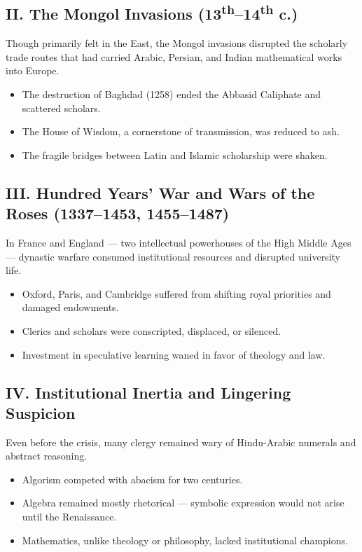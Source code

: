 \documentclass[9pt]{article}
\begin{document}
\subsection*{II. The Mongol Invasions (13\textsuperscript{th}–14\textsuperscript{th} c.)}

Though primarily felt in the East, the Mongol invasions disrupted the scholarly trade routes that had carried Arabic, Persian, and Indian mathematical works into Europe.

\begin{itemize}
    \item The destruction of Baghdad (1258) ended the Abbasid Caliphate and scattered scholars.
    \item The House of Wisdom, a cornerstone of transmission, was reduced to ash.
    \item The fragile bridges between Latin and Islamic scholarship were shaken.
\end{itemize}

\subsection*{III. Hundred Years’ War and Wars of the Roses (1337–1453, 1455–1487)}

In France and England — two intellectual powerhouses of the High Middle Ages — dynastic warfare consumed institutional resources and disrupted university life.

\begin{itemize}
    \item Oxford, Paris, and Cambridge suffered from shifting royal priorities and damaged endowments.
    \item Clerics and scholars were conscripted, displaced, or silenced.
    \item Investment in speculative learning waned in favor of theology and law.
\end{itemize}

\subsection*{IV. Institutional Inertia and Lingering Suspicion}

Even before the crisis, many clergy remained wary of Hindu-Arabic numerals and abstract reasoning.

\begin{itemize}
    \item Algorism competed with abacism for two centuries.
    \item Algebra remained mostly rhetorical — symbolic expression would not arise until the Renaissance.
    \item Mathematics, unlike theology or philosophy, lacked institutional champions.
\end{itemize}
\end{document}
